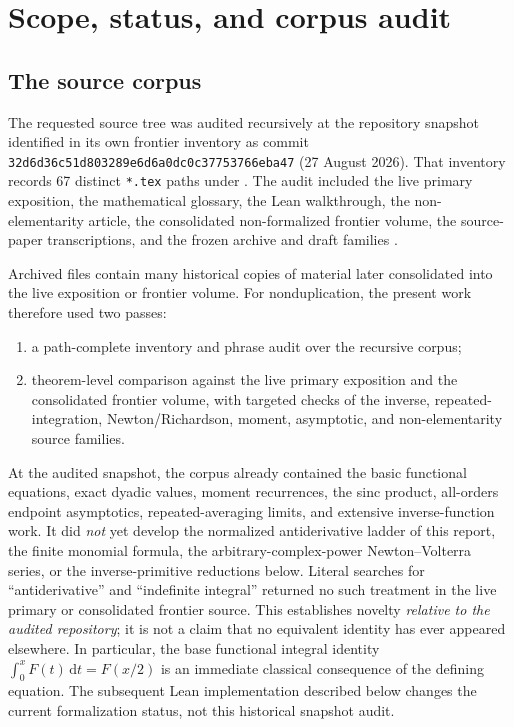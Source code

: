 \documentclass[11pt,oneside]{article}
\theoremstyle{definition}
\theoremstyle{remark}
\newcommand{\dd}{\,\mathrm d}
\newcommand{\1}{\mathbf 1}
\begin{document}
\newpage

\section{Scope, status, and corpus audit}

\subsection{The source corpus}
The requested source tree was audited recursively at the repository snapshot
identified in its own frontier inventory as commit
\texttt{32d6d36c51d803289e6d6a0dc0c37753766eba47} (27 August 2026).  That
inventory records 67 distinct \texttt{*.tex} paths under
.  The audit included the live primary
exposition, the mathematical glossary, the Lean walkthrough, the
non-elementarity article, the consolidated non-formalized frontier volume,
the source-paper transcriptions, and the frozen archive and draft families
\cite{p1:ProveItPrimary,p1:ProveItFrontiers,p1:ProveItGlossary,p1:ProveItLean,p1:ProveItNonElementary,p1:ProveItInventory}.

Archived files contain many historical copies of material later consolidated
into the live exposition or frontier volume.  For nonduplication, the present
work therefore used two passes:
\begin{enumerate}
\item a path-complete inventory and phrase audit over the recursive corpus;
\item theorem-level comparison against the live primary exposition and the
      consolidated frontier volume, with targeted checks of the inverse,
      repeated-integration, Newton/Richardson, moment, asymptotic, and
      non-elementarity source families.
\end{enumerate}
At the audited snapshot, the corpus already contained the basic functional
equations, exact dyadic values, moment recurrences, the sinc product,
all-orders endpoint asymptotics, repeated-averaging limits, and extensive
inverse-function work.  It did \emph{not} yet develop the normalized
antiderivative ladder of this report, the finite monomial formula, the
arbitrary-complex-power Newton--Volterra series, or the inverse-primitive
reductions below.  Literal searches for
``antiderivative'' and ``indefinite integral'' returned no such treatment in
the live primary or consolidated frontier source.  This establishes novelty
\emph{relative to the audited repository}; it is not a claim that no equivalent
identity has ever appeared elsewhere.  In particular, the base functional
integral identity \(\int_0^xF(t)\dd t=F(x/2)\) is an immediate classical
consequence of the defining equation.  The subsequent Lean implementation
described below changes the current formalization status, not this historical
snapshot audit.
\end{document}
